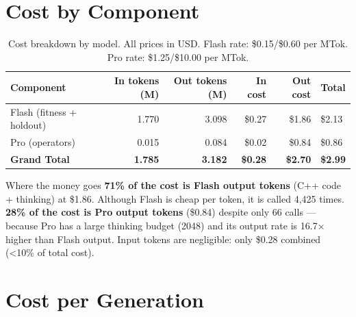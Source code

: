 \documentclass[11pt,a4paper]{report}
\begin{document}
\section{Cost by Component}

\begin{table}[h]
\centering
\begin{tabular}{@{}lrrrrl@{}}
\toprule
\textbf{Component} & {\textbf{In tokens (M)}} & {\textbf{Out tokens (M)}} & {\textbf{In cost}} & {\textbf{Out cost}} & {\textbf{Total}} \\
\midrule
Flash (fitness + holdout) & 1.770 & 3.098 & \$0.27 & \$1.86 & \$2.13 \\
Pro (operators)           & 0.015 & 0.084 & \$0.02 & \$0.84 & \$0.86 \\
\midrule
\textbf{Grand Total}      & \textbf{1.785} & \textbf{3.182} & \textbf{\$0.28} & \textbf{\$2.70} & \textbf{\$2.99} \\
\bottomrule
\end{tabular}
\caption{Cost breakdown by model.  All prices in USD.
         Flash rate: \$0.15/\$0.60 per MTok.  Pro rate: \$1.25/\$10.00 per MTok.}
\label{tab:cost-breakdown}
\end{table}

\begin{conceptbox}{Where the money goes}
\textbf{71\% of the cost is Flash output tokens} (C++ code + thinking) at \$1.86.
Although Flash is cheap per token, it is called 4,425 times.
\textbf{28\% of the cost is Pro output tokens} (\$0.84) despite only 66 calls ---
because Pro has a large thinking budget (2048) and its output rate is 16.7$\times$
higher than Flash output.
Input tokens are negligible: only \$0.28 combined (\textless 10\% of total cost).
\end{conceptbox}

\section{Cost per Generation}
\end{document}
